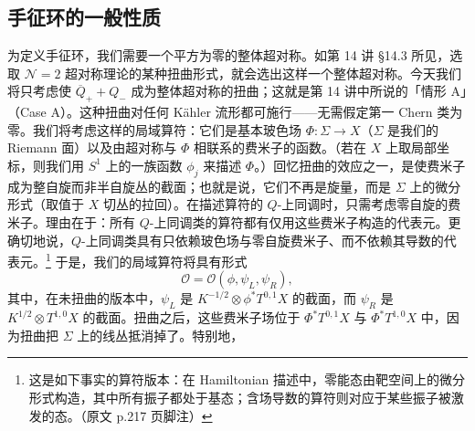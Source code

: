 
\subsection{手征环的一般性质}

为定义手征环，我们需要一个平方为零的整体超对称。如第 14 讲 §14.3 所见，选取 $\mathcal{N}=2$ 超对称理论的某种扭曲形式，就会选出这样一个整体超对称。今天我们将只考虑使 $\overline{Q}_+ + Q_-$ 成为整体超对称的扭曲；这就是第 14 讲中所说的「情形 A」（Case A）。这种扭曲对任何 Kähler 流形都可施行——无需假定第一 Chern 类为零。我们将考虑这样的局域算符：它们是基本玻色场 $\Phi:\Sigma\to X$（$\Sigma$ 是我们的 Riemann 面）以及由超对称与 $\Phi$ 相联系的费米子的函数。（若在 $X$ 上取局部坐标，则我们用 $S^1$ 上的一族函数 $\phi_j$ 来描述 $\Phi$。）回忆扭曲的效应之一，是使费米子成为整自旋而非半自旋丛的截面；也就是说，它们不再是旋量，而是 $\Sigma$ 上的微分形式（取值于 $X$ 切丛的拉回）。在描述算符的 $Q$-上同调时，只需考虑零自旋的费米子。理由在于：所有 $Q$-上同调类的算符都有仅用这些费米子构造的代表元。更确切地说，$Q$-上同调类具有只依赖玻色场与零自旋费米子、而不依赖其导数的代表元。\footnote{这是如下事实的算符版本：在 Hamiltonian 描述中，零能态由靶空间上的微分形式构造，其中所有振子都处于基态；含场导数的算符则对应于某些振子被激发的态。（原文 p.217 页脚注）} 于是，我们的局域算符将具有形式
\[
  \mathcal{O}=\mathcal{O}(\phi,\psi_L,\psi_R),
\]
其中，在未扭曲的版本中，$\psi_L$ 是 $K^{-1/2}\otimes\phi^*T^{0,1}X$ 的截面，而 $\psi_R$ 是 $K^{1/2}\otimes T^{1,0}X$ 的截面。扭曲之后，这些费米子场位于 $\Phi^*T^{0,1}X$ 与 $\Phi^*T^{1,0}X$ 中，因为扭曲把 $\Sigma$ 上的线丛抵消掉了。特别地，


